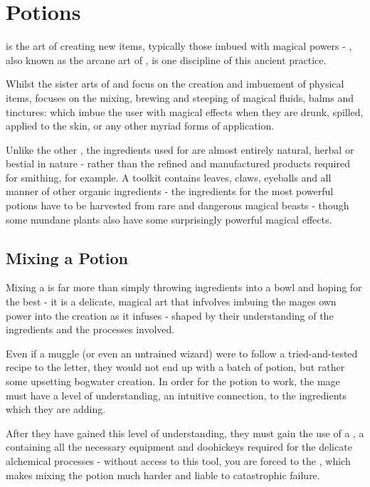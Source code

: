 \chapter{Potions}

 is the art of creating new items, typically those imbued with magical powers - , also known as the arcane art of , is one discipline of this ancient practice. 

Whilst the sister arts of  and  focus on the creation and imbuement of physical items,  focuses on the mixing, brewing and steeping of magical fluids, balms and tinctures:  which imbue the user with magical effects when they are drunk, spilled, applied to the skin, or any other myriad forms of application. 

Unlike the other , the ingredients used for  are almost entirely natural, herbal or bestial in nature - rather than the refined and manufactured products required for smithing, for example. A  toolkit contains leaves, claws, eyeballs and all manner of other organic ingredients - the ingredients for the most powerful potions have to be harvested from rare and dangerous magical beasts - though some mundane plants also have some surprisingly powerful magical effects. 

\section{Mixing a Potion}

Mixing a  is far more than simply throwing ingredients into a bowl and hoping for the best - it is a delicate, magical art that infvolves imbuing the mages own power into the creation as it infuses - shaped by their understanding of the ingredients and the processes involved. 

Even if a muggle (or even an untrained wizard) were to follow a tried-and-tested recipe to the letter, they would not end up with a batch of  potion, but rather some upsetting bogwater creation. In order for the potion to work, the mage must have a level of understanding, an intuitive connection, to the ingredients which they are adding. 

After they have gained this level of understanding, they must gain the use of a , a  containing all the necessary equipment and doohickeys required for the delicate alchemical processes - without access to this tool, you are forced to  the , which makes mixing the potion much harder and liable to catastrophic failure. 


